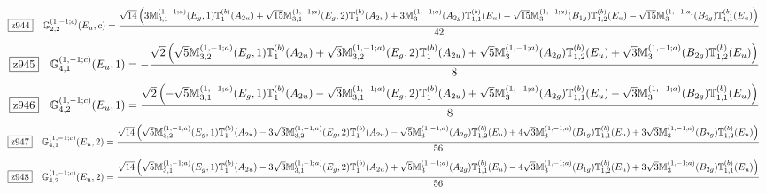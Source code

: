 \documentclass[fleqn,10pt,landscape]{jsarticle}
\begin{document}
\begin{dmath*}
\hspace*{3mm}\fbox{z944}\quad \mathbb{G}_{2,2}^{(1,-1;c)}(E_{u},c)=\frac{\sqrt{14} \left(3 \mathbb{M}_{3,1}^{(1,-1;a)}(E_{g},1) \mathbb{T}_{1}^{(b)}(A_{2u}) + \sqrt{15} \mathbb{M}_{3,1}^{(1,-1;a)}(E_{g},2) \mathbb{T}_{1}^{(b)}(A_{2u}) + 3 \mathbb{M}_{3}^{(1,-1;a)}(A_{2g}) \mathbb{T}_{1,1}^{(b)}(E_{u}) - \sqrt{15} \mathbb{M}_{3}^{(1,-1;a)}(B_{1g}) \mathbb{T}_{1,2}^{(b)}(E_{u}) - \sqrt{15} \mathbb{M}_{3}^{(1,-1;a)}(B_{2g}) \mathbb{T}_{1,1}^{(b)}(E_{u})\right)}{42}
\end{dmath*}
\begin{dmath*}
\hspace*{3mm}\fbox{z945}\quad \mathbb{G}_{4,1}^{(1,-1;c)}(E_{u},1)=- \frac{\sqrt{2} \left(\sqrt{5} \mathbb{M}_{3,2}^{(1,-1;a)}(E_{g},1) \mathbb{T}_{1}^{(b)}(A_{2u}) + \sqrt{3} \mathbb{M}_{3,2}^{(1,-1;a)}(E_{g},2) \mathbb{T}_{1}^{(b)}(A_{2u}) + \sqrt{5} \mathbb{M}_{3}^{(1,-1;a)}(A_{2g}) \mathbb{T}_{1,2}^{(b)}(E_{u}) + \sqrt{3} \mathbb{M}_{3}^{(1,-1;a)}(B_{2g}) \mathbb{T}_{1,2}^{(b)}(E_{u})\right)}{8}
\end{dmath*}
\begin{dmath*}
\hspace*{3mm}\fbox{z946}\quad \mathbb{G}_{4,2}^{(1,-1;c)}(E_{u},1)=\frac{\sqrt{2} \left(- \sqrt{5} \mathbb{M}_{3,1}^{(1,-1;a)}(E_{g},1) \mathbb{T}_{1}^{(b)}(A_{2u}) - \sqrt{3} \mathbb{M}_{3,1}^{(1,-1;a)}(E_{g},2) \mathbb{T}_{1}^{(b)}(A_{2u}) + \sqrt{5} \mathbb{M}_{3}^{(1,-1;a)}(A_{2g}) \mathbb{T}_{1,1}^{(b)}(E_{u}) - \sqrt{3} \mathbb{M}_{3}^{(1,-1;a)}(B_{2g}) \mathbb{T}_{1,1}^{(b)}(E_{u})\right)}{8}
\end{dmath*}
\begin{dmath*}
\hspace*{3mm}\fbox{z947}\quad \mathbb{G}_{4,1}^{(1,-1;c)}(E_{u},2)=\frac{\sqrt{14} \left(\sqrt{5} \mathbb{M}_{3,2}^{(1,-1;a)}(E_{g},1) \mathbb{T}_{1}^{(b)}(A_{2u}) - 3 \sqrt{3} \mathbb{M}_{3,2}^{(1,-1;a)}(E_{g},2) \mathbb{T}_{1}^{(b)}(A_{2u}) - \sqrt{5} \mathbb{M}_{3}^{(1,-1;a)}(A_{2g}) \mathbb{T}_{1,2}^{(b)}(E_{u}) + 4 \sqrt{3} \mathbb{M}_{3}^{(1,-1;a)}(B_{1g}) \mathbb{T}_{1,1}^{(b)}(E_{u}) + 3 \sqrt{3} \mathbb{M}_{3}^{(1,-1;a)}(B_{2g}) \mathbb{T}_{1,2}^{(b)}(E_{u})\right)}{56}
\end{dmath*}
\begin{dmath*}
\hspace*{3mm}\fbox{z948}\quad \mathbb{G}_{4,2}^{(1,-1;c)}(E_{u},2)=\frac{\sqrt{14} \left(\sqrt{5} \mathbb{M}_{3,1}^{(1,-1;a)}(E_{g},1) \mathbb{T}_{1}^{(b)}(A_{2u}) - 3 \sqrt{3} \mathbb{M}_{3,1}^{(1,-1;a)}(E_{g},2) \mathbb{T}_{1}^{(b)}(A_{2u}) + \sqrt{5} \mathbb{M}_{3}^{(1,-1;a)}(A_{2g}) \mathbb{T}_{1,1}^{(b)}(E_{u}) - 4 \sqrt{3} \mathbb{M}_{3}^{(1,-1;a)}(B_{1g}) \mathbb{T}_{1,2}^{(b)}(E_{u}) + 3 \sqrt{3} \mathbb{M}_{3}^{(1,-1;a)}(B_{2g}) \mathbb{T}_{1,1}^{(b)}(E_{u})\right)}{56}
\end{dmath*}
\end{document}
